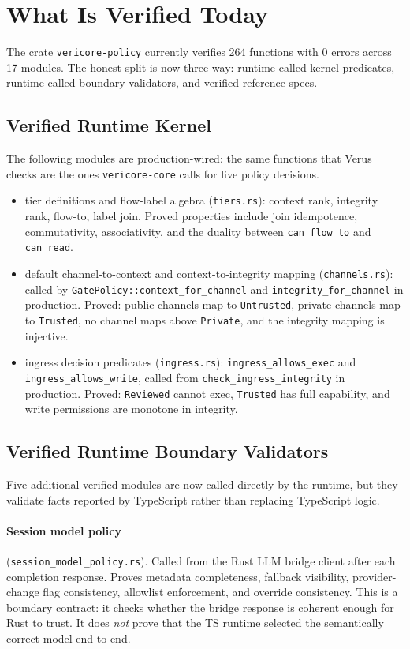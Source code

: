 \documentclass[11pt]{article}
\begin{document}
\section{What Is Verified Today}
The crate \texttt{vericore-policy} currently verifies 264 functions with 0 errors across 17 modules. The honest split is now three-way: runtime-called kernel predicates, runtime-called boundary validators, and verified reference specs.

\subsection{Verified Runtime Kernel}
The following modules are production-wired: the same functions that Verus checks are the ones \texttt{vericore-core} calls for live policy decisions.
\begin{itemize}[leftmargin=1.5em]
\item tier definitions and flow-label algebra (\texttt{tiers.rs}): context rank, integrity rank, flow-to, label join. Proved properties include join idempotence, commutativity, associativity, and the duality between \texttt{can\_flow\_to} and \texttt{can\_read}.
\item default channel-to-context and context-to-integrity mapping (\texttt{channels.rs}): called by \texttt{GatePolicy::context\_for\_channel} and \texttt{integrity\_for\_channel} in production. Proved: public channels map to \texttt{Untrusted}, private channels map to \texttt{Trusted}, no channel maps above \texttt{Private}, and the integrity mapping is injective.
\item ingress decision predicates (\texttt{ingress.rs}): \texttt{ingress\_allows\_exec} and \texttt{ingress\_allows\_write}, called from \texttt{check\_ingress\_integrity} in production. Proved: \texttt{Reviewed} cannot exec, \texttt{Trusted} has full capability, and write permissions are monotone in integrity.
\end{itemize}

\subsection{Verified Runtime Boundary Validators}
Five additional verified modules are now called directly by the runtime, but they validate facts reported by TypeScript rather than replacing TypeScript logic.

\paragraph{Session model policy} (\texttt{session\_model\_policy.rs}). Called from the Rust LLM bridge client after each completion response. Proves metadata completeness, fallback visibility, provider-change flag consistency, allowlist enforcement, and override consistency. This is a boundary contract: it checks whether the bridge response is coherent enough for Rust to trust. It does \emph{not} prove that the TS runtime selected the semantically correct model end to end.
\end{document}
